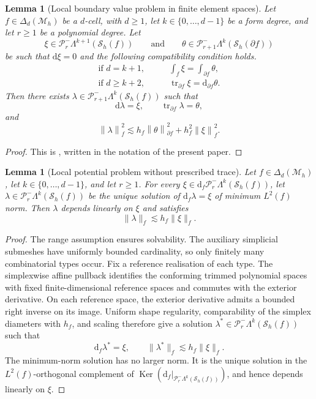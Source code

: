 \documentclass[a4paper,11pt]{article}
\newtheorem{lemma}[theorem]{Lemma}
\theoremstyle{definition}
\newcommand{\DIFF}{\mathrm{d}}
\newcommand{\Mh}{\mathcal{M}_h}
\newcommand{\Sh}{\mathcal{S}_h}
\newcommand{\FM}[1]{\Delta_{#1}}
\newcommand{\PLtrim}[2]{\mathcal{P}_{#1}^{-}\Lambda^{#2}}
\newcommand{\norm}[2]{\left\lVert #2\right\rVert_{#1}}
\newcommand{\trc}{\operatorname{tr}}
\newcommand{\Ker}{\operatorname{Ker}}
\begin{document}
\begin{lemma}[Local boundary value problem in finite element spaces]
\label{lem:first.local.problem}
Let $f\in\FM{d}(\Mh)$ be a $d$-cell, with $d\ge1$, let $k\in\{0,\ldots,d-1\}$ be a form degree, and let $r\ge1$ be a polynomial degree.
Let
\[
  \xi\in\PLtrim{r}{k+1}(\Sh(f))
  \qquad\text{and}\qquad
  \theta\in\PLtrim{r+1}{k}(\Sh(\partial f))
\]
be such that $\DIFF\xi=0$ and the following compatibility condition holds.
  \begin{align*}
    \text{if $d=k+1$},&
    \qquad
    \int_f \xi = \int_{\partial f}\theta,\\
    \text{if $d\ge k+2$},&
    \qquad
    \trc_{\partial f}\xi = \DIFF_{\partial f}\theta.
  \end{align*}
Then there exists $\lambda\in\PLtrim{r+1}{k}(\Sh(f))$ such that
\[
  \DIFF\lambda=\xi,
  \qquad
  \trc_{\partial f}\lambda=\theta,
\]
and
\[
  \norm{f}{\lambda}^2
  \lesssim
  h_f\norm{\partial f}{\theta}^2
  +
  h_f^2\norm{f}{\xi}^2.
\]
\end{lemma}
\begin{proof}
This is \cite[Lemma~11]{Di-Pietro.Droniou.Pitassi:25}, written in the notation of the present paper.
\end{proof}

\begin{lemma}[Local potential problem without prescribed trace]
\label{lem:local.potential.problem}
Let $f\in\FM{d}(\Mh)$, let $k\in\{0,\ldots,d-1\}$, and let $r\geq1$.
For every $\xi\in\DIFF_f\PLtrim{r}{k}(\Sh(f))$, let $\lambda\in\PLtrim{r}{k}(\Sh(f))$ be the unique solution of $\DIFF_f\lambda=\xi$ of minimum $L^2(f)$ norm.
Then $\lambda$ depends linearly on $\xi$ and satisfies
\[
  \|\lambda\|_f
  \lesssim
  h_f\|\xi\|_f.
\]
\end{lemma}
\begin{proof}
The range assumption ensures solvability.
The auxiliary simplicial submeshes have uniformly bounded cardinality, so only finitely many combinatorial types occur.
Fix a reference realisation of each type.
The simplexwise affine pullback identifies the conforming trimmed polynomial spaces with fixed finite-dimensional reference spaces and commutes with the exterior derivative.
On each reference space, the exterior derivative admits a bounded right inverse on its image.
Uniform shape regularity, comparability of the simplex diameters with $h_f$, and scaling therefore give a solution $\lambda^*\in\PLtrim{r}{k}(\Sh(f))$ such that
\[
  \DIFF_f\lambda^*=\xi,
  \qquad
  \|\lambda^*\|_f\lesssim h_f\|\xi\|_f.
\]
The minimum-norm solution has no larger norm.
It is the unique solution in the $L^2(f)$-orthogonal complement of $\Ker(\DIFF_f|_{\PLtrim{r}{k}(\Sh(f))})$, and hence depends linearly on $\xi$.
\end{proof}
\end{document}
